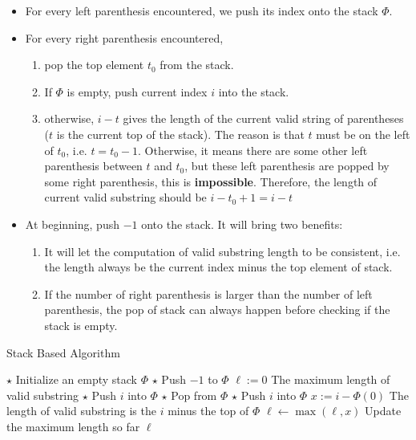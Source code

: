 \begin{itemize}
\item For every left parenthesis encountered, we push its index onto the stack $\Phi$.
\item For every right parenthesis encountered, 
\begin{enumerate}
\item pop the top element $t_0$ from the stack.
\item If $\Phi$ is empty, push current index $i$ into the stack.
\item otherwise, $i-t$ gives the length of the current valid string of parentheses ($t$ is the current top of the stack). The reason is that $t$ must be on the left of $t_0$, i.e. $t = t_0-1$. Otherwise, it means there are some other left parenthesis between $t$ and $t_0$, but these left parenthesis are popped by some right parenthesis, this is \textbf{impossible}. Therefore, the length of current valid substring should be $i - t_0 + 1 = i-t$
\end{enumerate}
\item At beginning, push $-1$ onto the stack. It will bring two benefits: 
\begin{enumerate}
\item It will let the computation of valid substring length to be consistent, i.e. the length always be the current index minus the top element of stack.
\item If the number of right parenthesis is larger than the number of left parenthesis, the pop of stack can always happen before checking if the stack is empty.
\end{enumerate}
\end{itemize}

\begin{algorithm}[H]
\caption{Stack Based Algorithm}
\begin{algorithmic}[1]
\State $\star$ Initialize an empty stack $\Phi$
\State $\star$ Push $-1$ to $\Phi$
\State $\ell:=0$ \Comment The maximum length of valid substring
\State $\star$ Push $i$ into $\Phi$
\Else
\State $\star$ Pop from $\Phi$
\State $\star$ Push $i$ into $\Phi$
\Else
\State $x := i - \Phi(0)$ \Comment The length of valid substring is the $i$ minus the top of $\Phi$
\State $\ell\gets \max(\ell, x)$ \Comment Update the maximum length so far
\EndIf
\EndIf
\EndFor
\State \Return $\ell$
\EndProcedure
\end{algorithmic}
\end{algorithm}

